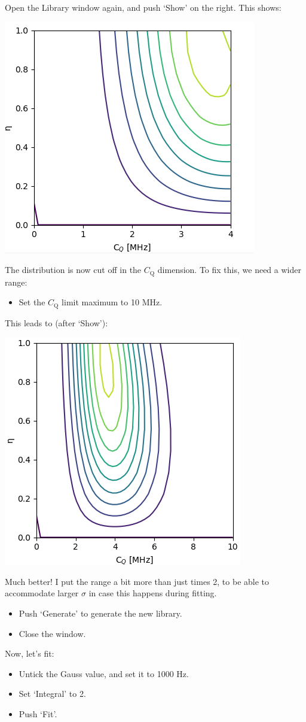 \documentclass[11pt,a4paper]{article}
\begin{document}
Open the Library window again, and push `Show' on the right. This shows:
\begin{center}
\includegraphics[width=0.5\linewidth]{Figs/fig6.PNG}
\end{center}
The distribution is now cut off in the $C_\text{Q}$ dimension. To fix this, we need a wider range:
\begin{itemize}
  \item Set the $C_\text{Q}$ limit maximum to 10 MHz.
\end{itemize}
This leads to (after `Show'):

\begin{center}
\includegraphics[width=0.5\linewidth]{Figs/fig7.PNG}
\end{center}
Much better! I put the range a bit more than just times 2, to be able to accommodate larger $\sigma$ in case this happens during fitting.
\begin{itemize}
  \item Push `Generate' to generate the new library.
  \item Close the window.
\end{itemize}
Now, let's fit:
\begin{itemize}
  \item Untick the Gauss value, and set it to 1000 Hz.
  \item Set `Integral' to 2.
  \item Push `Fit'.
\end{itemize}
\end{document}
